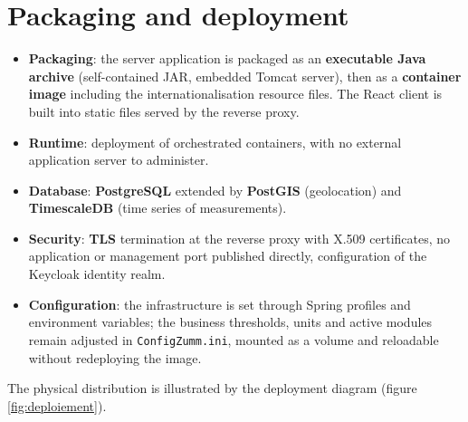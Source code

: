 \section{Packaging and deployment}
\begin{itemize}
  \item \textbf{Packaging}: the server application is packaged as an \textbf{executable Java archive} (self-contained JAR, embedded Tomcat server), then as a \textbf{container image} including the internationalisation resource files. The React client is built into static files served by the reverse proxy.
  \item \textbf{Runtime}: deployment of orchestrated containers, with no external application server to administer.
  \item \textbf{Database}: \textbf{PostgreSQL} extended by \textbf{PostGIS} (geolocation) and \textbf{TimescaleDB} (time series of measurements).
  \item \textbf{Security}: \textbf{TLS} termination at the reverse proxy with X.509 certificates, no application or management port published directly, configuration of the Keycloak identity realm.
  \item \textbf{Configuration}: the infrastructure is set through Spring profiles and environment variables; the business thresholds, units and active modules remain adjusted in \texttt{ConfigZumm.ini}, mounted as a volume and reloadable without redeploying the image.
\end{itemize}
The physical distribution is illustrated by the deployment diagram (figure \ref{fig:deploiement}).
